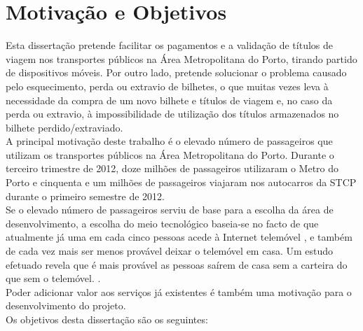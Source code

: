 \section{Motivação e Objetivos} \label{sec:goals}

Esta dissertação pretende facilitar os pagamentos e a validação de títulos de viagem nos transportes públicos na Área Metropolitana do Porto, tirando partido de dispositivos móveis. Por outro lado, pretende solucionar o problema causado pelo esquecimento, perda ou extravio de bilhetes, o que muitas vezes leva à necessidade da compra de um novo bilhete e títulos de viagem e, no caso da perda ou extravio, à impossibilidade de utilização dos títulos armazenados no bilhete perdido/extraviado.
\\A principal motivação deste trabalho é o elevado número de passageiros que utilizam os transportes públicos na Área Metropolitana do Porto. Durante o terceiro trimestre de 2012, doze milhões de passageiros utilizaram o Metro do Porto \cite{INE20121127} e cinquenta e um milhões de passageiros viajaram nos autocarros da STCP durante o primeiro semestre de 2012. \cite{CMVM}
\\Se o elevado número de passageiros serviu de base para a escolha da área de desenvolvimento, a escolha do meio tecnológico baseia-se no facto de que atualmente já uma em cada cinco pessoas acede à Internet  telemóvel \cite{INE20121106}, e também de cada vez mais ser menos provável deixar o telemóvel em casa. Um estudo efetuado revela que é mais provável as pessoas saírem de casa sem a carteira do que sem o telemóvel. \cite{NFCForum2011}.
\\Poder adicionar valor aos serviços já existentes é também uma motivação para o desenvolvimento do projeto.
\\Os objetivos desta dissertação são os seguintes:
